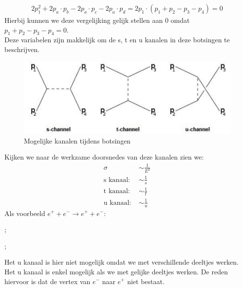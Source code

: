 \documentclass[../main.tex]{subfiles}
\begin{document}
\begin{equation}
    \begin{aligned}
        \label{eq:stu_help}
        2p_1^2+2p_a\cdot p_b-2p_a\cdot p_c-2p_a\cdot p_d = 2p_1\cdot (p_1 + p_2 - p_3 -p_4) = 0
    \end{aligned}
\end{equation}
Hierbij kunnen we deze vergelijking gelijk stellen aan $0$ omdat $p_1 + p_2 - p_3 -p_4 = 0$.\\
Deze variabelen zijn makkelijk om de s, t en u kanalen in deze botsingen te beschrijven.

\begin{figure}[h]
    \centering
    \includegraphics[width=0.8\linewidth]{introduction_and_review/kanalen.png}
    \caption{Mogelijke kanalen tijdens botsingen}%
    \label{fig:kanalen}
\end{figure}

Kijken we naar de werkzame doorsnedes van deze kanalen zien we:
\begin{equation}
    \begin{aligned}
        \label{eq:kanalen_doorsnede}
        \sigma&\sim\frac{1}{E^2}\\
        \text{s kanaal: }&\sim\frac{1}{s}\\
        \text{t kanaal: }&\sim\frac{1}{t}\\
        \text{u kanaal: }&\sim\frac{1}{u}
    \end{aligned}
\end{equation}
Als voorbeeld $e^+ +e^- \rightarrow e^+ + e^-$:\\
\begin{minipage}[c]{0.5\textwidth}
    \begin{center}
        ;
    \end{center}
\end{minipage}\noindent
\begin{minipage}[c]{0.5\textwidth}
    \begin{center}
        ;
    \end{center}
\end{minipage}
Het u kanaal is hier niet mogelijk omdat we met verschillende deeltjes werken. Het u kanaal is enkel mogelijk als we met gelijke deeltjes werken. De reden hiervoor is dat de vertex van $e^-$ naar $e^+$ niet bestaat.
\end{document}
